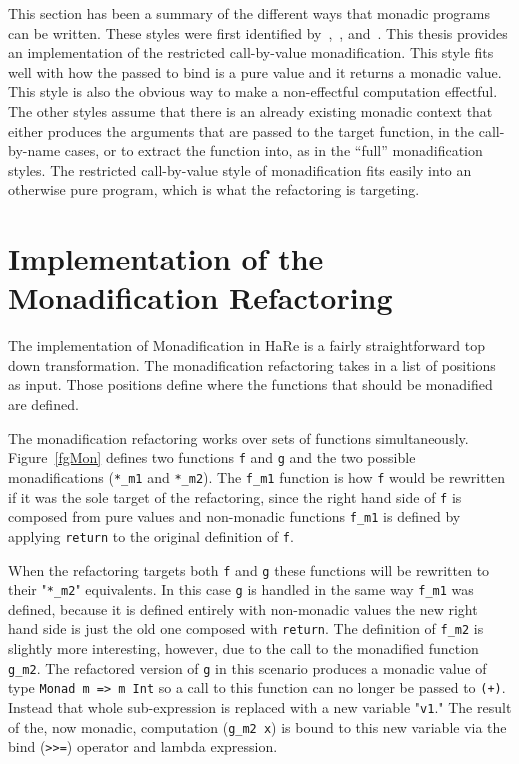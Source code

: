 This section has been a summary of the different ways that monadic programs can be written. These styles were first identified by~\cite{lammelReuse},~\cite{monadification}, and~\cite{monadSurvey}. This thesis provides an implementation of the restricted call-by-value monadification. This style fits well with how the passed to bind is a pure value and it returns a monadic value. This style is also the obvious way to make a non-effectful computation effectful. The other styles assume that there is an already existing monadic context that either produces the arguments that are passed to the target function, in the call-by-name cases, or to extract the function into, as in the ``full'' monadification styles. The restricted call-by-value style of monadification fits easily into an otherwise pure program, which is what the refactoring is targeting.  

\section{Implementation of the Monadification Refactoring}
\label{monadImp}

The implementation of Monadification in HaRe is a fairly straightforward top down transformation. The monadification refactoring takes in a list of positions as input. Those positions define where the functions that should be monadified are defined. 

The monadification refactoring works over sets of functions simultaneously. Figure~\ref{fgMon} defines two functions \texttt{f} and \texttt{g} and the two possible monadifications (\texttt{*\_m1} and \texttt{*\_m2}). The \texttt{f\_m1} function is how \texttt{f} would be rewritten if it was the sole target of the refactoring, since the right hand side of \texttt{f} is composed from pure values and non-monadic functions \texttt{f\_m1} is defined by applying \texttt{return} to the original definition of \texttt{f}.

When the refactoring targets both \texttt{f} and \texttt{g} these functions will be rewritten to their "\texttt{*\_m2}" equivalents. In this case \texttt{g} is handled in the same way \texttt{f\_m1} was defined, because it is defined entirely with non-monadic values the new right hand side is just the old one composed with \texttt{return}. The definition of \texttt{f\_m2} is slightly more interesting, however, due to the call to the monadified function \texttt{g\_m2}. The refactored version of \texttt{g} in this scenario produces a monadic value of type \texttt{Monad m => m Int} so a call to this function can no longer be passed to \texttt{(+)}. Instead that whole sub-expression is replaced with a new variable "\texttt{v1}." The result of the, now monadic, computation (\texttt{g\_m2 x}) is bound to this new variable via the bind (\texttt{>>=}) operator and lambda expression. 

